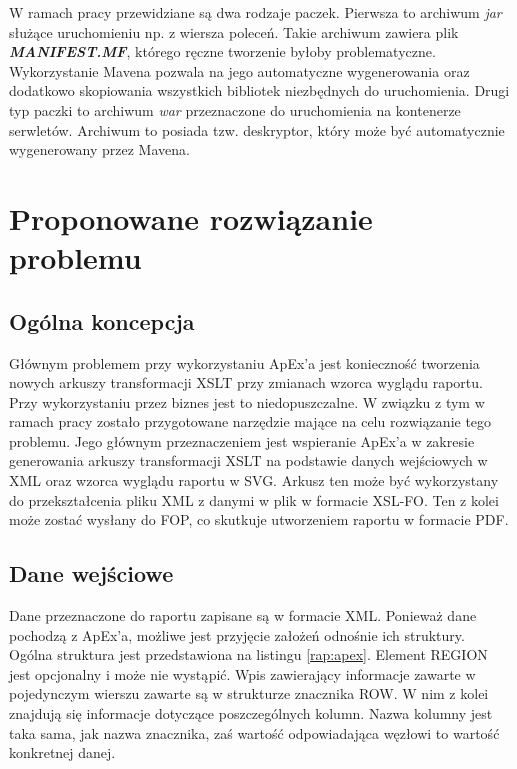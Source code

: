 \documentclass[11pt,a4paper]{article}
\begin{document}
W ramach pracy przewidziane są dwa rodzaje paczek. Pierwsza to archiwum \emph{jar} służące uruchomieniu np. z wiersza poleceń. Takie archiwum zawiera plik \textbf{\emph{MANIFEST.MF}}, którego ręczne tworzenie byłoby problematyczne. Wykorzystanie Mavena pozwala na jego automatyczne wygenerowania oraz dodatkowo skopiowania wszystkich bibliotek niezbędnych do uruchomienia. Drugi typ paczki to archiwum \emph{war} przeznaczone do uruchomienia na kontenerze serwletów. Archiwum to posiada tzw. deskryptor, który może być automatycznie wygenerowany przez Mavena.

\newpage


\section{Proponowane rozwiązanie problemu} \label{sec:solution}
\subsection{Ogólna koncepcja} \label{solution:koncept}
Głównym problemem przy wykorzystaniu ApEx'a jest konieczność tworzenia nowych arkuszy transformacji XSLT przy zmianach wzorca wyglądu raportu. Przy wykorzystaniu przez biznes jest to niedopuszczalne. W związku z tym w ramach pracy zostało przygotowane narzędzie mające na celu rozwiązanie tego problemu. Jego głównym przeznaczeniem jest wspieranie ApEx'a w zakresie generowania arkuszy transformacji XSLT na podstawie danych wejściowych w XML oraz wzorca wyglądu raportu w SVG. Arkusz ten może być wykorzystany do przekształcenia pliku XML z danymi w plik w formacie XSL-FO. Ten z kolei może zostać wysłany do FOP, co skutkuje utworzeniem raportu w formacie PDF.

\subsection{Dane wejściowe} \label{solution:data}
Dane przeznaczone do raportu zapisane są w formacie XML. Ponieważ dane pochodzą z ApEx'a, możliwe jest przyjęcie założeń odnośnie ich struktury. Ogólna struktura jest przedstawiona na listingu \ref{rap:apex}. Element REGION jest opcjonalny i może nie wystąpić. Wpis zawierający informacje zawarte w pojedynczym wierszu zawarte są w strukturze znacznika ROW. W nim z kolei znajdują się informacje dotyczące poszczególnych kolumn. Nazwa kolumny jest taka sama, jak nazwa znacznika, zaś wartość odpowiadająca węzłowi to wartość konkretnej danej.
\end{document}
